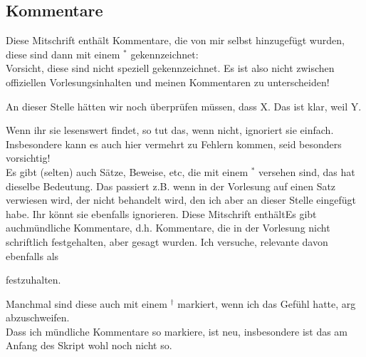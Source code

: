 \subsection*{Kommentare}
    Diese Mitschrift enthält Kommentare, die von mir selbst hinzugefügt wurden\ifshowstars, diese sind dann mit einem $^*$ gekennzeichnet:\else\\ \Warning Vorsicht, diese sind nicht speziell gekennzeichnet. Es ist also nicht zwischen offiziellen Vorlesungsinhalten und meinen Kommentaren zu unterscheiden!\fi %
    \begin{remark*}
        An dieser Stelle hätten wir noch überprüfen müssen, dass X. Das ist klar, weil Y.
    \end{remark*}
    Wenn ihr sie lesenswert findet, so tut das, wenn nicht, ignoriert sie einfach. Insbesondere kann es auch hier vermehrt zu Fehlern kommen, seid besonders vorsichtig!\\
    Es gibt (selten) auch Sätze, Beweise, etc, die mit einem $^*$ versehen sind, das hat dieselbe Bedeutung. Das passiert z.B. wenn in der Vorlesung auf einen Satz verwiesen wird, der nicht behandelt wird, den ich aber an dieser Stelle eingefügt habe. Ihr könnt sie ebenfalls ignorieren.
\ifincludeoral Diese Mitschrift enthält\else Es gibt auch\fi mündliche Kommentare, d.h. Kommentare, die in der Vorlesung nicht schriftlich festgehalten, aber gesagt wurden. Ich versuche, relevante davon ebenfalls als
\begin{oral}
    festzuhalten.
\end{oral}
Manchmal sind diese auch mit einem $^\dagger$ markiert, wenn ich das Gefühl hatte, arg abzuschweifen. \\
{\footnotesize Dass ich mündliche Kommentare so markiere, ist neu, insbesondere ist das am Anfang des Skript wohl noch nicht so.}
\fi %

    
